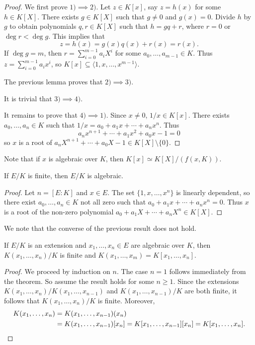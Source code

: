 \begin{proof}
	We first prove $1)\implies 2)$. Let $z\in K[x]$, say $z=h(x)$ for some $h\in K[X]$. There exists
	$g\in K[X]$ such that $g\ne 0$ and $g(x)=0$. Divide $h$ by $g$ to obtain 
	polynomials $q,r\in K[X]$ such that $h=gq+r$, where $r=0$ or $\deg r<\deg g$. This implies that
	\[
		z=h(x)=g(x)q(x)+r(x)=r(x).
	\]
	If $\deg g=m$, then $r=\sum_{i=0}^{m-1}a_iX^i$ for some $a_0,\dots,a_{m-1}\in K$. Thus
	$z=\sum_{i=0}^{m-1}a_ix^i$, so $K[x]\subseteq\langle 1,x,\dots,x^{m-1}\rangle$. 

	The previous lemma proves that $2)\implies 3)$. 

	It is trivial that $3)\implies 4)$. 

	It remains to prove that $4)\implies 1)$. 
	Since $x\ne 0$, $1/x\in K[x]$. There exists $a_0,\dots,a_n\in K$ such that
	$1/x=a_0+a_1x+\cdots+a_nx^n$. Thus
	\[
		a_nx^{n+1}+\cdots+a_1x^2+a_0x-1=0
	\]
	so $x$ is a root of $a_nX^{n+1}+\cdots+a_0X-1\in K[X]\setminus\{0\}$. 
\end{proof}

Note that if $x$ is algebraic over $K$, then
$K[x]\simeq K[X]/(f(x,K))$. 

\begin{corollary}
	If $E/K$ is finite, then $E/K$ is algebraic. 
\end{corollary}

\begin{proof}
	Let $n=[E:K]$ and $x\in E$. The set $\{1,x,\dots,x^n\}$ is linearly dependent, 
	so there exist $a_0,\dots,a_n\in K$ not all zero such that
	$a_0+a_1x+\cdots+a_nx^n=0$. Thus $x$ is a root of the non-zero
	polynomial $a_0+a_1X+\cdots+a_nX^n\in K[X]$. 
\end{proof}

We note that the converse of the previous result does not hold. 

\begin{corollary}
	If $E/K$ is an extension and $x_1,\dots,x_n\in E$ 
	are algebraic over $K$, then 
	$K(x_1,\dots,x_n)/K$ is finite and
	$K(x_1,\dots,x_m)=K[x_1,\dots,x_n]$. 
\end{corollary}

\begin{proof}
	We proceed by induction on $n$. The case $n=1$ follows immediately from 
	the theorem. So assume the result holds for some $n\geq1$. Since the extensions 
	$K(x_1,\dots,x_n)/K(x_1,\dots,x_{n-1})$ and $K(x_1,\dots,x_{n-1})/K$ are
	both finite, it follows that $K(x_1,\dots,x_n)/K$ is finite. Moreover, 
	\begin{align*}
	K(x_1,\dots,x_n)&=K(x_1,\dots,x_{n-1})(x_n)\\
	&=K(x_1,\dots,x_{n-1})[x_n]=K[x_1,\dots,x_{n-1}][x_n]=K[x_1,\dots,x_n].\qedhere
    \end{align*}
\end{proof}

